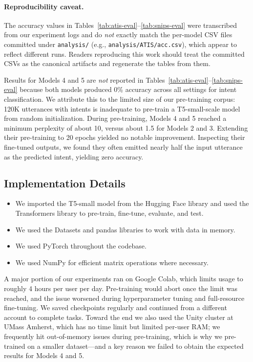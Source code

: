 \documentclass[11pt]{article}
\begin{document}
\paragraph{Reproducibility caveat.} The accuracy values in
Tables~\ref{tab:atis-eval}--\ref{tab:snips-eval} were transcribed from our
experiment logs and do \emph{not} exactly match the per-model CSV files
committed under \texttt{analysis/} (e.g., \texttt{analysis/ATIS/acc.csv}),
which appear to reflect different runs. Readers reproducing this work should
treat the committed CSVs as the canonical artifacts and regenerate the tables
from them.

Results for Models 4 and 5 are \emph{not} reported in
Tables~\ref{tab:atis-eval}--\ref{tab:snips-eval} because both models produced
0\% accuracy across all settings for intent classification. We attribute this
to the limited size of our pre-training corpus: 120K utterances with intents
is inadequate to pre-train a T5-small-scale model from random initialization.
During pre-training, Models 4 and 5 reached a minimum perplexity of about 10,
versus about 1.5 for Models 2 and 3. Extending their pre-training to 20
epochs yielded no notable improvement. Inspecting their fine-tuned outputs,
we found they often emitted nearly half the input utterance as the predicted
intent, yielding zero accuracy.

\subsection{Implementation Details}

\begin{itemize}
  \item We imported the T5-small model from the Hugging Face library and used
        the Transformers library to pre-train, fine-tune, evaluate, and test.
  \item We used the Datasets and pandas libraries to work with data in
        memory.
  \item We used PyTorch throughout the codebase.
  \item We used NumPy for efficient matrix operations where necessary.
\end{itemize}

A major portion of our experiments ran on Google Colab, which limits usage
to roughly 4 hours per user per day. Pre-training would abort once the limit
was reached, and the issue worsened during hyperparameter tuning and
full-resource fine-tuning. We saved checkpoints regularly and continued from
a different account to complete tasks. Toward the end we also used the Unity
cluster at UMass Amherst, which has no time limit but limited per-user RAM;
we frequently hit out-of-memory issues during pre-training, which is why we
pre-trained on a smaller dataset---and a key reason we failed to obtain the
expected results for Models 4 and 5.
\end{document}
